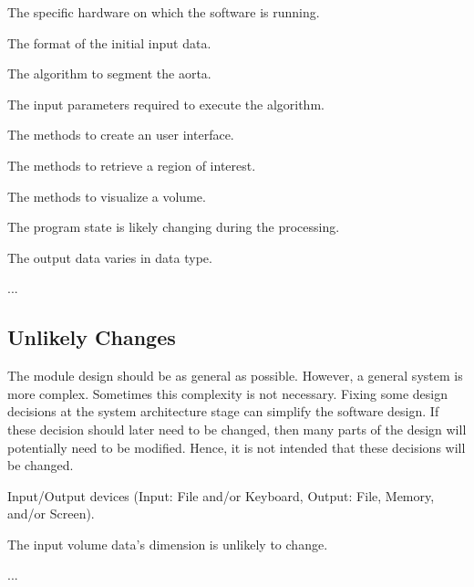 \documentclass[12pt, titlepage]{article}
\newcounter{acnum}
\newcommand{\actheacnum}{AC\theacnum}
\newcounter{ucnum}
\newcommand{\uctheucnum}{UC\theucnum}
\begin{document}
\begin{description}
\item[ \actheacnum \label{acHardware}:] The specific hardware on which the software is running.
\item[ \actheacnum \label{acInput}:] The format of the initial input data.
\item[ \actheacnum \label{acAlgo}:] The algorithm to segment the aorta.
\item[ \actheacnum \label{acInputParams}:] The input parameters required to execute the algorithm.
\item[ \actheacnum \label{acInterface}:] The methods to create an user interface.
\item[ \actheacnum \label{acGetROI}:] The methods to retrieve a region of interest.
\item[ \actheacnum \label{acVisualize}:] The methods to visualize a volume.
\item[ \actheacnum \label{acControl}:] The program state is likely changing during the processing.
\item[ \actheacnum \label{acOutput}:] The output data varies in data type.

\item ...
\end{description}

\subsection{Unlikely Changes} \label{SecUchange}

The module design should be as general as possible. However, a general system is
more complex. Sometimes this complexity is not necessary. Fixing some design
decisions at the system architecture stage can simplify the software design. If
these decision should later need to be changed, then many parts of the design
will potentially need to be modified. Hence, it is not intended that these
decisions will be changed.

\begin{description}
\item[ \uctheucnum \label{ucIO}:] Input/Output devices
  (Input: File and/or Keyboard, Output: File, Memory, and/or Screen).
\item[ \uctheucnum \label{ucVolDim}:] The input volume data's dimension is unlikely to change.
\item ...
\end{description}
\end{document}
